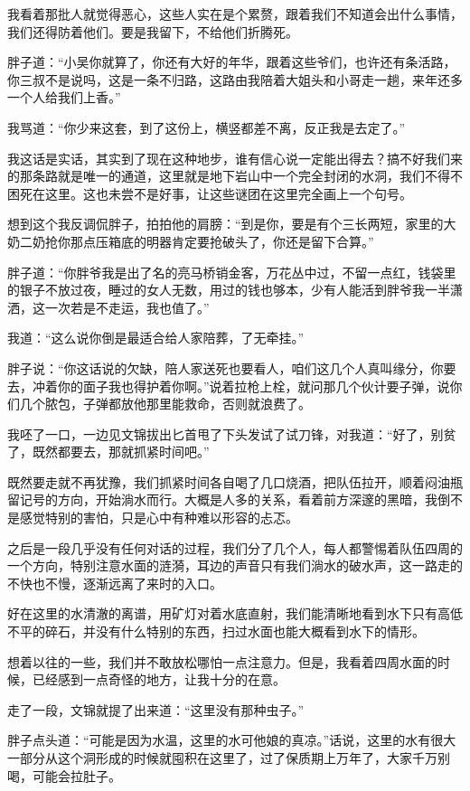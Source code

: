我看着那批人就觉得恶心，这些人实在是个累赘，跟着我们不知道会出什么事情，我们还得防着他们。要是我留下，不给他们折腾死。

胖子道：“小吴你就算了，你还有大好的年华，跟着这些爷们，也许还有条活路，你三叔不是说吗，这是一条不归路，这路由我陪着大姐头和小哥走一趟，来年还多一个人给我们上香。”

我骂道：“你少来这套，到了这份上，横竖都差不离，反正我是去定了。”

我这话是实话，其实到了现在这种地步，谁有信心说一定能出得去？搞不好我们来的那条路就是唯一的通道，这里就是地下岩山中一个完全封闭的水洞，我们不得不困死在这里。这也未尝不是好事，让这些谜团在这里完全画上一个句号。

想到这个我反调侃胖子，拍拍他的肩膀：“到是你，要是有个三长两短，家里的大奶二奶抢你那点压箱底的明器肯定要抢破头了，你还是留下合算。”

胖子道：“你胖爷我是出了名的亮马桥销金客，万花丛中过，不留一点红，钱袋里的银子不放过夜，睡过的女人无数，用过的钱也够本，少有人能活到胖爷我一半潇洒，这一次若是不走运，我也值了。”

我道：“这么说你倒是最适合给人家陪葬，了无牵挂。”

胖子说：“你这话说的欠缺，陪人家送死也要看人，咱们这几个人真叫缘分，你要去，冲着你的面子我也得护着你啊。”说着拉枪上栓，就问那几个伙计要子弹，说你们几个脓包，子弹都放他那里能救命，否则就浪费了。

我呸了一口，一边见文锦拔出匕首甩了下头发试了试刀锋，对我道：“好了，别贫了，既然都要去，那就抓紧时间吧。”

既然要走就不再犹豫，我们抓紧时间各自喝了几口烧酒，把队伍拉开，顺着闷油瓶留记号的方向，开始淌水而行。大概是人多的关系，看着前方深邃的黑暗，我倒不是感觉特别的害怕，只是心中有种难以形容的忐忑。

之后是一段几乎没有任何对话的过程，我们分了几个人，每人都警惕着队伍四周的一个方向，特别注意水面的涟漪，耳边的声音只有我们淌水的破水声，这一路走的不快也不慢，逐渐远离了来时的入口。

好在这里的水清澈的离谱，用矿灯对着水底直射，我们能清晰地看到水下只有高低不平的碎石，并没有什么特别的东西，扫过水面也能大概看到水下的情形。

想着以往的一些，我们并不敢放松哪怕一点注意力。但是，我看着四周水面的时候，已经感到一点奇怪的地方，让我十分的在意。

走了一段，文锦就提了出来道：“这里没有那种虫子。”

胖子点头道：“可能是因为水温，这里的水可他娘的真凉。”话说，这里的水有很大一部分从这个洞形成的时候就囤积在这里了，过了保质期上万年了，大家千万别喝，可能会拉肚子。

